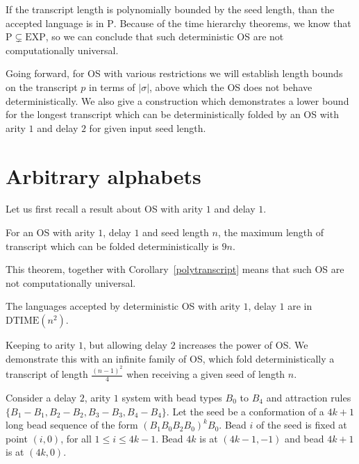 \documentclass[]{llncs}
\begin{document}
If the transcript length is polynomially bounded by the seed length, than the accepted language is in $\mathrm{P}$. Because of the time hierarchy theorems, we know that $\mathrm{P}\subsetneq \mathrm{EXP}$, so we can conclude that such deterministic OS are not computationally universal.


Going forward, for OS with various restrictions we will establish length bounds on the transcript $p$ in terms of $|\sigma|$, above which the OS does not behave deterministically. We also give a construction which demonstrates a lower bound for the longest transcript which can be deterministically folded by an OS with arity $1$ and delay $2$ for given input seed length.


\section{Arbitrary alphabets}
Let us first recall a result about OS with arity $1$ and delay $1$.
\begin{theorem}\cite{ARITY1D1}
For an OS with arity $1$, delay $1$ and seed length $n$, the maximum length of transcript which can be folded deterministically is $9n$.
\end{theorem}

This theorem, together with Corollary~\ref{polytranscript} means that such OS are not computationally universal.
\begin{corollary}
The languages accepted by deterministic OS with arity $1$, delay $1$ are in $\mathrm{DTIME}(n^2)$.
\end{corollary}

Keeping to arity $1$, but allowing delay $2$ increases the power of OS. We demonstrate this with an infinite family of OS, which fold deterministically a transcript of length $\frac{(n-1)^2}{4}$ when receiving a given seed of length $n$.

Consider a delay $2$, arity $1$ system with bead types $B_0$ to $B_4$ and attraction rules $\{B_1-B_1,B_2-B_2, B_3-B_3,B_4-B_4\}$. Let the seed be a conformation of a $4k+1$ long bead sequence of the form $(B_1B_0B_2B_0)^kB_0$. Bead $i$ of the seed is fixed at point $(i,0)$, for all $1\leq i\leq 4k-1$. Bead $4k$ is at $(4k-1,-1)$ and bead $4k+1$ is at $(4k,0)$.
\end{document}
